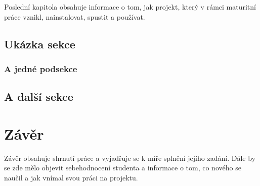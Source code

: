 \documentclass[11pt,a4paper,twoside,openright]{report}
\let\openright=\cleardoublepage
\begin{document}
Poslední kapitola obsahuje informace o tom, jak projekt, který v rámci maturitní práce vznikl, nainstalovat, spustit a používat.


\section{Ukázka sekce}

\lipsum[5]

\subsection{A jedné podsekce}

\lipsum

\section{A další sekce}

\lipsum

\chapter*{Závěr}
\pagestyle{empty}

Závěr obsahuje shrnutí práce a vyjadřuje se k míře splnění jejího zadání. Dále by se zde mělo objevit sebehodnocení studenta a informace o tom, co nového se naučil a jak vnímal svou práci na projektu.

\nocite{einstein}\nocite{latexcompanion}\nocite{knuthwebsite}
\printbibliography[title={Seznam použité literatury},heading={bibintoc}]

\openright
\listoffigures
{}

\clearpage
\listoftables
{}


\end{document}
